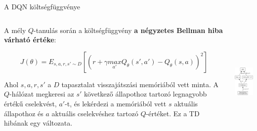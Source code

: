 \documentclass[english, aspectratio=169]{beamer}
\begin{document}
\begin{frame}{A DQN költségfüggvénye}
\begin{columns}
\begin{column}{.75\textwidth}
A mély $Q$-tanulás során a költségfüggvény \textbf{a négyzetes Bellman hiba várható értéke}:
\begin{block}{}
\vspace{-0.5cm}
\[
J(\theta) = E_{s,a,r,s' \sim D} \left[ \left( r + \gamma \underset{a'}{max} Q_\theta(s',a') - Q_\theta(s,a) \right)^2 \right]
\]
\end{block}	
Ahol $s,a,r,s'$ a $D$ tapasztalat visszajátszási memóriából vett minta. A $Q$-hálózat megkeresi az $s'$ következő állapothoz tartozó legnagyobb értékű cselekvést, $a'$-t, és lekérdezi a memóriából vett $s$ aktuális állapothoz és $a$ aktuális cselekvéshez tartozó $Q$-értéket. Ez a TD hibának egy változata.  
\end{column}
\begin{column}{.25\textwidth}
\begin{center}
\includegraphics[height=6cm, keepaspectratio]{graphs/dql_1.png}
\end{center}
\end{column}
\end{columns}
\end{frame}
\end{document}
